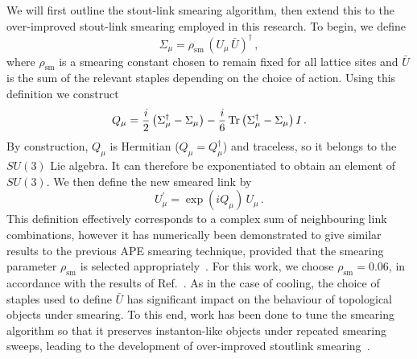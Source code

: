 We will first outline the stout-link smearing algorithm, then extend this to the over-improved stout-link smearing employed in this research. To begin, we define
%
\begin{equation}
\Sigma_\mu = \rho_\text{sm}\,(U_\mu\,\bar{U})^\dagger\, ,
\end{equation}
%
where $\rho_\text{sm}$ is a smearing constant chosen to remain fixed for all lattice sites and $\bar{U}$ is the sum of the relevant staples depending on the choice of action. Using this definition we construct
%
\begin{equation}
Q_\mu = \frac{i}{2}\left( \Sigma_\mu^\dagger - \Sigma_\mu \right) - \frac{i}{6}\operatorname{Tr}\left(\Sigma_\mu^\dagger - \Sigma_\mu\right)I\, .
\end{equation}
By construction, $Q_\mu$ is Hermitian ($Q_\mu = Q_\mu^\dagger$) and traceless, so it belongs to the $SU(3)$ Lie algebra. It can therefore be exponentiated to obtain an element of $SU(3)$. We then define the new smeared link by
%
\begin{equation}
U_\mu^\prime = \exp(iQ_\mu)\,U_\mu\, .
\end{equation}
%
This definition effectively corresponds to a complex sum of neighbouring link combinations, however it has numerically been demonstrated to give similar results to the previous APE smearing technique, provided that the smearing parameter $\rho_\text{sm}$ is selected appropriately~\cite{Morningstar:2003gk}. For this work, we choose $\rho_\text{sm}=0.06$, in accordance with the results of Ref.~\cite{Moran:2008ra}. As in the case of cooling, the choice of staples used to define $\bar{U}$ has significant impact on the behaviour of topological objects under smearing. To this end, work has been done to tune the smearing algorithm so that it preserves instanton-like objects under repeated smearing sweeps, leading to the development of over-improved stoutlink smearing~\cite{Moran:2008ra}.\\

